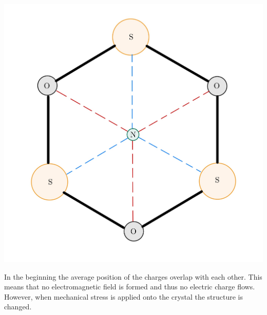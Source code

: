 \begin{minipage}{0.33\textwidth}
    \includegraphics[width=\textwidth]{./Figure_2.jpg}
    \label{fig:Quartzcell without any influence}
\end{minipage}
\begin{minipage}{0.66\textwidth}
    In the beginning the average position of the charges overlap with each other. This means that no electromagnetic field is formed and thus no electric charge flows. However, when mechanical stress is applied onto the crystal the structure is changed.\\
\end{minipage}
